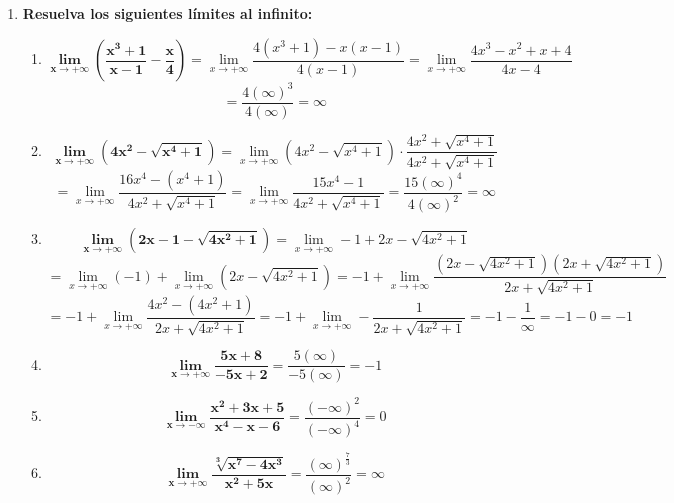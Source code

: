 \documentclass[12pt]{article}
\begin{document}
\begin{enumerate}[label=\textbf{\arabic*.}]
            
            \vspace{1cm}\hrule
            \item \textbf{Resuelva los siguientes límites al infinito:}
                \begin{enumerate}[label=\textbf{\arabic*)}] 
                    \item \[\bm{\lim_{x \to +\infty} \left( \frac{x^3 + 1}{x - 1} - \frac{x}{4} \right)} = \lim_{x \to +\infty} \frac{4(x^3 + 1) - x(x - 1)}{4(x - 1)} = \lim_{x \to +\infty} \frac{4x^3 - x^2 + x + 4}{4x - 4}\] \[= \frac{4(\infty)^3}{4(\infty)} = \infty\]
                    \item \[\bm{\lim_{x \to +\infty} \left( 4x^2 - \sqrt{x^4 + 1} \right)} = \lim_{x \to +\infty} \left( 4x^2 - \sqrt{x^4 + 1} \right) \cdot \frac{4x^2 + \sqrt{x^4 + 1}}{4x^2 + \sqrt{x^4 + 1}}\] \[= \lim_{x \to +\infty} \frac{16x^4 - (x^4 + 1)}{4x^2 + \sqrt{x^4 + 1}} = \lim_{x \to +\infty} \frac{15x^4 - 1}{4x^2 + \sqrt{x^4 + 1}} = \frac{15(\infty)^4}{4(\infty)^2} = \infty\]
                    \item \[\bm{\lim_{x \to +\infty} \left( 2x - 1 - \sqrt{4x^2 + 1} \right)} = \lim_{x \to +\infty} - 1 + 2x - \sqrt{4x^2 + 1}\] \[= \lim_{x \to +\infty} (-1) + \lim_{x \to +\infty} (2x - \sqrt{4x^2 + 1}) = -1 + \lim_{x \to +\infty} \frac{(2x - \sqrt{4x^2 + 1})(2x + \sqrt{4x^2 + 1})}{2x + \sqrt{4x^2 + 1}}\] \[= -1 + \lim_{x \to +\infty} \frac{4x^2 - (4x^2 + 1)}{2x + \sqrt{4x^2 + 1}} = -1 + \lim_{x \to +\infty} -\frac{1}{2x + \sqrt{4x^2 + 1}} = -1 - \frac{1}{\infty} = - 1 - 0 = -1\]
                    \item \[\bm{\lim_{x \to +\infty} \frac{5x + 8}{-5x + 2}} = \frac{5(\infty)}{-5(\infty)} = -1\]
                    \item \[\bm{\lim_{x \to -\infty} \frac{x^2 + 3x + 5}{x^4 - x - 6}} = \frac{(-\infty)^2}{(-\infty)^4} = 0\]
                    \item \[\bm{\lim_{x \to +\infty} \frac{\sqrt[3]{x^7 - 4x^3}}{x^2 + 5x}} = \frac{(\infty)^{\frac{7}{3}}}{(\infty)^2} = \infty\]
                \end{enumerate}

        
        \end{enumerate}
\end{document}
